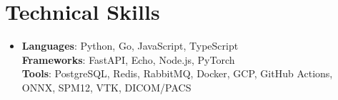 \documentclass[letterpaper,11pt]{article}
\begin{document}
%
\section{Technical Skills}
\begin{itemize}[leftmargin=0.15in, label={}, topsep=0pt, itemsep=0pt, parsep=0pt, partopsep=0pt]
  \item{\fontsize{9.0pt}{9.25pt}\selectfont
   \textbf{Languages}{: Python, Go, JavaScript, TypeScript} \\
   \textbf{Frameworks}{: FastAPI, Echo, Node.js, PyTorch} \\
   \textbf{Tools}{: PostgreSQL, Redis, RabbitMQ, Docker, GCP, GitHub Actions, ONNX, SPM12, VTK, DICOM/PACS}
  }
\end{itemize}
\end{document}
